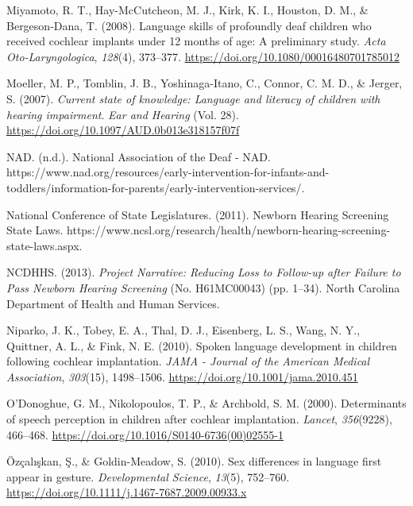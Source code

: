 \documentclass[english,man]{apa6}
\begin{document}
\leavevmode\hypertarget{ref-miyamoto2008}{}%
Miyamoto, R. T., Hay-McCutcheon, M. J., Kirk, K. I., Houston, D. M., \& Bergeson-Dana, T. (2008). Language skills of profoundly deaf children who received cochlear implants under 12 months of age: A preliminary study. \emph{Acta Oto-Laryngologica}, \emph{128}(4), 373--377. \url{https://doi.org/10.1080/00016480701785012}

\leavevmode\hypertarget{ref-moeller2007}{}%
Moeller, M. P., Tomblin, J. B., Yoshinaga-Itano, C., Connor, C. M. D., \& Jerger, S. (2007). \emph{Current state of knowledge: Language and literacy of children with hearing impairment}. \emph{Ear and Hearing} (Vol. 28). \url{https://doi.org/10.1097/AUD.0b013e318157f07f}

\leavevmode\hypertarget{ref-nad}{}%
NAD. (n.d.). National Association of the Deaf - NAD. https://www.nad.org/resources/early-intervention-for-infants-and-toddlers/information-for-parents/early-intervention-services/.

\leavevmode\hypertarget{ref-nationalconferenceofstatelegislatures2011}{}%
National Conference of State Legislatures. (2011). Newborn Hearing Screening State Laws. https://www.ncsl.org/research/health/newborn-hearing-screening-state-laws.aspx.

\leavevmode\hypertarget{ref-ncdhhs2013}{}%
NCDHHS. (2013). \emph{Project Narrative: Reducing Loss to Follow-up after Failure to Pass Newborn Hearing Screening} (No. H61MC00043) (pp. 1--34). North Carolina Department of Health and Human Services.

\leavevmode\hypertarget{ref-niparko2010}{}%
Niparko, J. K., Tobey, E. A., Thal, D. J., Eisenberg, L. S., Wang, N. Y., Quittner, A. L., \& Fink, N. E. (2010). Spoken language development in children following cochlear implantation. \emph{JAMA - Journal of the American Medical Association}, \emph{303}(15), 1498--1506. \url{https://doi.org/10.1001/jama.2010.451}

\leavevmode\hypertarget{ref-odonoghue2000}{}%
O'Donoghue, G. M., Nikolopoulos, T. P., \& Archbold, S. M. (2000). Determinants of speech perception in children after cochlear implantation. \emph{Lancet}, \emph{356}(9228), 466--468. \url{https://doi.org/10.1016/S0140-6736(00)02555-1}

\leavevmode\hypertarget{ref-ozcaliskan2010}{}%
Özçalışkan, Ş., \& Goldin-Meadow, S. (2010). Sex differences in language first appear in gesture. \emph{Developmental Science}, \emph{13}(5), 752--760. \url{https://doi.org/10.1111/j.1467-7687.2009.00933.x}
\end{document}
